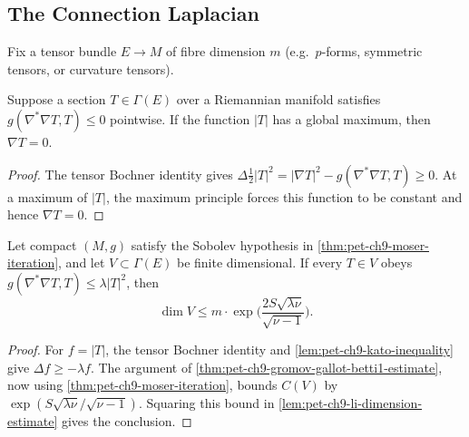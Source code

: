 \subsection{The Connection Laplacian}

Fix a tensor bundle $E\to M$ of fibre dimension $m$ (e.g.\ $p$-forms,
symmetric tensors, or curvature tensors).

\begin{proposition}
  \label{prop:pet-ch9-vanishing-connection-laplacian}

  Suppose a section $T\in\Gamma(E)$ over a Riemannian manifold satisfies
  $g(\nabla^*\nabla T,T)\le0$ pointwise.  If the function $|T|$ has a global
  maximum, then $\nabla T=0$.
\end{proposition}
\begin{proof}
  \sketch
  The tensor Bochner identity gives
  \(\Delta\tfrac12|T|^2=|\nabla T|^2-g(\nabla^*\nabla T,T)\ge0\).
  At a maximum of \(|T|\), the maximum principle forces this function to be
  constant and hence \(\nabla T=0\).
\end{proof}

\begin{theorem}
  \label{thm:pet-ch9-gallot-connection-laplacian-estimate}

  Let compact $(M,g)$ satisfy the Sobolev hypothesis in
  \cref{thm:pet-ch9-moser-iteration}, and let $V\subset\Gamma(E)$ be finite
  dimensional.  If every $T\in V$ obeys
  $g(\nabla^*\nabla T,T)\le\lambda|T|^2$, then
  \[
    \dim V\le
    m\cdot\exp\Big(\frac{2S\sqrt{\lambda\nu}}{\sqrt{\nu-1}}\Big).
  \]
\end{theorem}
\begin{proof}
  \sketch
  For \(f=|T|\), the tensor Bochner identity and
  \cref{lem:pet-ch9-kato-inequality} give \(\Delta f\ge-\lambda f\).
  The argument of \cref{thm:pet-ch9-gromov-gallot-betti1-estimate}, now using
  \cref{thm:pet-ch9-moser-iteration}, bounds
  \(C(V)\) by
  \(\exp(S\sqrt{\lambda\nu}/\sqrt{\nu-1})\). Squaring this bound in
  \cref{lem:pet-ch9-li-dimension-estimate} gives the conclusion.
\end{proof}

